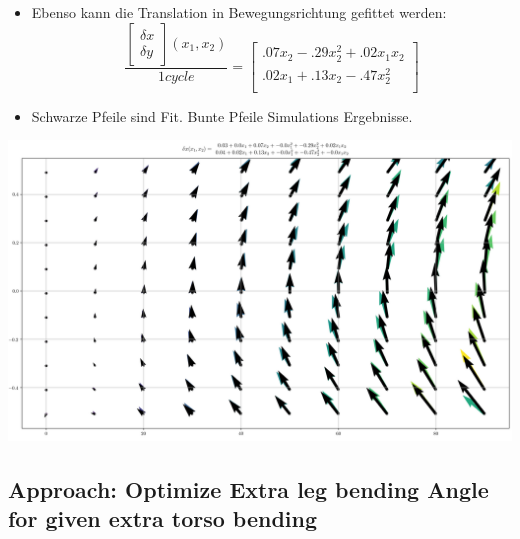 \documentclass[10pt,a4paper]{article}
\begin{document}
\begin{itemize}
	\item Ebenso kann die Translation in Bewegungsrichtung gefittet werden:
	\begin{equation}
		\frac{\begin{bmatrix}	\delta x \\ \delta y \end{bmatrix} (x_1, x_2)}{1 cycle} = \begin{bmatrix}
		.07x_2 - .29 x_2^2 + .02 x_1x_2 \\
		.02x_1 + .13x_2 - .47x_2^2 \\
		\end{bmatrix}
	\end{equation}
	\item Schwarze Pfeile sind Fit. Bunte Pfeile Simulations Ergebnisse.
\end{itemize}

\includegraphics[width=.95\textwidth]{pics/model_2/FitDXDY_1cyc.jpg}



\subsection{Approach: Optimize Extra leg bending Angle for given extra torso bending}
\end{document}
